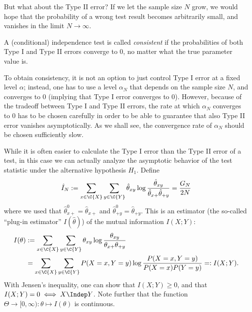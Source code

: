 But what about the Type II error? 
If we let the sample size $N$ grow, we would hope that the probability of a wrong test result becomes arbitrarily small, and
vanishes in the limit $N \to \infty$. 
\begin{Def}
A (conditional) independence test is called \emph{consistent} if the probabilities of both Type I and Type II errors converge to 0, no matter what the true parameter value is.
\end{Def}
To obtain consistency, it is not an option to just control Type I error at a fixed level $\alpha$; instead, one has to use a level $\alpha_N$
that depends on the sample size $N$, and converges to 0 (implying that Type I error converges to 0). However, because of the
tradeoff between Type I and Type II errors, the rate at which $\alpha_N$ converges to $0$ has to be chosen carefully in order to
be able to guarantee that also Type II error vanishes asymptotically. As we shall see, the convergence rate of $\alpha_N$ should be chosen
sufficiently slow.

While it is often easier to calculate the Type I error than the Type II error of
a test, in this case we can actually analyze the asymptotic behavior of the test statistic under the alternative hypothesis $H_1$.
Define
$$\hat I_N := \sum_{x\in\C{X}} \sum_{y\in\C{Y}} \hat \theta_{xy} \log \frac{\hat \theta_{xy}}{\hat \theta_{x+} \hat \theta_{+ y}}
    = \frac{G_N}{2N}$$
where we used that $\hat\theta^0_{x +} = \hat\theta_{x +}$ and $\hat\theta^0_{+ y} = \hat\theta_{+ y}$.
This is an estimator (the so-called ``plug-in estimator'' $I(\hat\theta)$) of the mutual information $I(X;Y)$:
\begin{equation*}\begin{split}
  I(\theta) & := \sum_{x\in\C{X}}\sum_{y\in\C{Y}} \theta_{xy} \log \frac{\theta_{xy}}{\theta_{x +} \theta_{+ y}} \\
  & = \sum_{x\in\C{X}} \sum_{y\in\C{Y}} P(X=x,Y=y) \log \frac{P(X=x,Y=y)}{P(X=x) P(Y=y)} =: I(X;Y).
\end{split}\end{equation*}
With Jensen's inequality, one can show that $I(X;Y) \ge 0$, and that $I(X;Y) = 0 \iff X \Indep Y$.
Note further that the function $\Theta \to [0,\infty) : \theta \mapsto I(\theta)$ is continuous.

